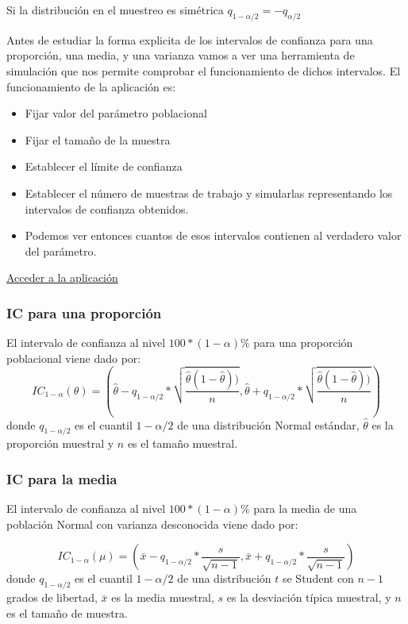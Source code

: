 \documentclass[
]{book}
\providecommand{\tightlist}{%
  \setlength{\itemsep}{0pt}\setlength{\parskip}{0pt}}
\begin{document}
Si la distribución en el muestreo es simétrica \(q_{1-\alpha/2} = - q_{\alpha/2}\)

Antes de estudiar la forma explicita de los intervalos de confianza para una proporción, una media, y una varianza vamos a ver una herramienta de simulación que nos permite comprobar el funcionamiento de dichos intervalos. El funcionamiento de la aplicación es:

\begin{itemize}
\tightlist
\item
  Fijar valor del parámetro poblacional
\item
  Fijar el tamaño de la muestra
\item
  Establecer el límite de confianza
\item
  Establecer el número de muestras de trabajo y simularlas representando los intervalos de confianza obtenidos.
\item
  Podemos ver entonces cuantos de esos intervalos contienen al verdadero valor del parámetro.
\end{itemize}

\href{https://istats.shinyapps.io/ExploreCoverage/}{Acceder a la aplicación}

\hypertarget{ic-para-una-proporciuxf3n}{%
\subsubsection{IC para una proporción}\label{ic-para-una-proporciuxf3n}}

El intervalo de confianza al nivel \(100*(1 - \alpha)\%\) para una proporción poblacional viene dado por: \[IC_{1-\alpha}(\theta) = \left(\hat{\theta} - q_{1-\alpha/2}*\sqrt{\frac{\hat{\theta} (1-\hat{\theta}))}{n}},\hat{\theta} + q_{1-\alpha/2}*\sqrt{\frac{\hat{\theta} (1-\hat{\theta}))}{n}}\right)\] donde \(q_{1-\alpha/2}\) es el cuantil \(1-\alpha/2\) de una distribución Normal estándar, \(\hat{\theta}\) es la proporción muestral y \(n\) es el tamaño muestral.

\hypertarget{ic-para-la-media}{%
\subsubsection{IC para la media}\label{ic-para-la-media}}

El intervalo de confianza al nivel \(100*(1 - \alpha)\%\) para la media de una población Normal con varianza desconocida viene dado por:

\[IC_{1-\alpha}(\mu) = \left(\bar{x} - q_{1-\alpha/2}*\frac{s}{\sqrt{n-1}},\bar{x} + q_{1-\alpha/2}*\frac{s}{\sqrt{n-1}}\right)\] donde \(q_{1-\alpha/2}\) es el cuantil \(1-\alpha/2\) de una distribución \(t\) se Student con \(n-1\) grados de libertad, \(\bar x\) es la media muestral, \(s\) es la desviación típica muestral, y \(n\) es el tamaño de muestra.
\end{document}
